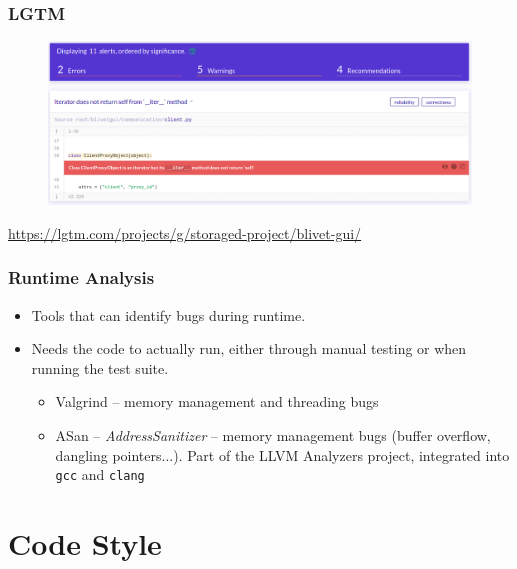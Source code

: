 \documentclass[aspectratio=169]{beamer}
\begin{document}
\begin{frame}
	\frametitle{LGTM}

\begin{figure}[ht!]
	\begin{center}
  	  \includegraphics[width=\textwidth]{img/lgtm.png}
	\end{center}
\end{figure}

\small\url{https://lgtm.com/projects/g/storaged-project/blivet-gui/}

\end{frame}

\begin{frame}
	\frametitle{Runtime Analysis}

	\begin{block}{}
		\begin{itemize}
			\item Tools that can identify bugs during runtime.
			\item Needs the code to actually run, either through manual testing or when running the test suite.
				\begin{itemize}
					\item Valgrind -- memory management and threading bugs\footnotemark
					\item ASan -- \emph{AddressSanitizer} -- memory management bugs (buffer overflow, dangling pointers...). Part of the LLVM Analyzers project, integrated into \texttt{gcc} and \texttt{clang}\footnotemark
				\end{itemize}
		\end{itemize}
	\end{block}


\end{frame}

\section{Code Style}
\end{document}
